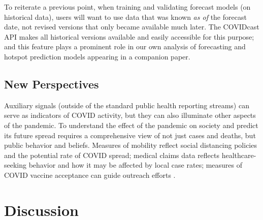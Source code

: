 \documentclass[9pt,twocolumn,twoside,lineno]{pnas-new}
\begin{document}
To reiterate a previous point, when training and validating forecast models (on
historical data), users will want to use data that was known \textit{as of} the
forecast date, not revised versions that only became available much later. The
COVIDcast API makes all historical versions available and easily accessible for
this purpose; and this feature plays a prominent role in our own analysis of
forecasting and hotspot prediction models appearing in a companion paper.

\subsection{New Perspectives}

Auxiliary signals (outside of the standard public health reporting streams) can
serve as indicators of COVID activity, but they can also illuminate other
aspects of the pandemic. To understand the effect of the pandemic on society and
predict its future spread requires a comprehensive view of not just cases and
deaths, but public behavior and beliefs. Measures of mobility reflect social
distancing policies and the potential rate of COVID spread; medical claims data
reflects healthcare-seeking behavior and how it may be affected by local case
rates; measures of COVID vaccine acceptance can guide outreach efforts
\cite{TODO}.




\section{Discussion}
\end{document}
